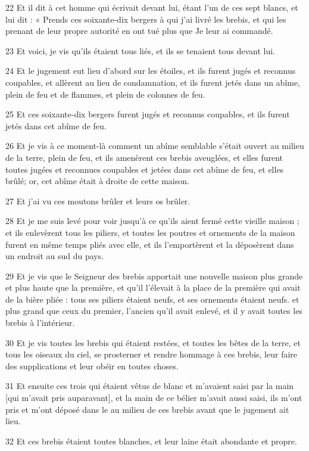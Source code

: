 \par 22 Et il dit à cet homme qui écrivait devant lui, étant l'un de ces sept blancs, et lui dit : « Prends ces soixante-dix bergers à qui j'ai livré les brebis, et qui les prenant de leur propre autorité en ont tué plus que Je leur ai commandé.
\par 23 Et voici, je vis qu'ils étaient tous liés, et ils se tenaient tous devant lui.
\par 24 Et le jugement eut lieu d'abord sur les étoiles, et ils furent jugés et reconnus coupables, et allèrent au lieu de condamnation, et ils furent jetés dans un abîme, plein de feu et de flammes, et plein de colonnes de feu.
\par 25 Et ces soixante-dix bergers furent jugés et reconnus coupables, et ils furent jetés dans cet abîme de feu.
\par 26 Et je vis à ce moment-là comment un abîme semblable s'était ouvert au milieu de la terre, plein de feu, et ils amenèrent ces brebis aveuglées, et elles furent toutes jugées et reconnues coupables et jetées dans cet abîme de feu, et elles brûlé; or, cet abîme était à droite de cette maison.
\par 27 Et j'ai vu ces moutons brûler et leurs os brûler.
\par 28 Et je me suis levé pour voir jusqu'à ce qu'ils aient fermé cette vieille maison ; et ils enlevèrent tous les piliers, et toutes les poutres et ornements de la maison furent en même temps pliés avec elle, et ils l'emportèrent et la déposèrent dans un endroit au sud du pays.
\par 29 Et je vis que le Seigneur des brebis apportait une nouvelle maison plus grande et plus haute que la première, et qu'il l'élevait à la place de la première qui avait de la bière pliée : tous ses piliers étaient neufs, et ses ornements étaient neufs. et plus grand que ceux du premier, l'ancien qu'il avait enlevé, et il y avait toutes les brebis à l'intérieur.
\par 30 Et je vis toutes les brebis qui étaient restées, et toutes les bêtes de la terre, et tous les oiseaux du ciel, se prosterner et rendre hommage à ces brebis, leur faire des supplications et leur obéir en toutes choses.
\par 31 Et ensuite ces trois qui étaient vêtus de blanc et m'avaient saisi par la main [qui m'avait pris auparavant], et la main de ce bélier m'avait aussi saisi, ils m'ont pris et m'ont déposé dans le au milieu de ces brebis avant que le jugement ait lieu.
\par 32 Et ces brebis étaient toutes blanches, et leur laine était abondante et propre.
